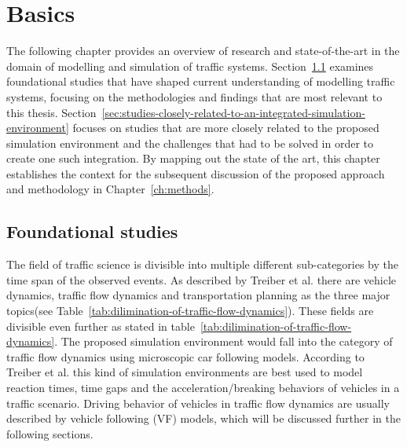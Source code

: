 \chapter{Basics}\label{ch:basics}
    The following chapter provides an overview of research and state-of-the-art in the domain of modelling and simulation of traffic systems.
    Section~\ref{sec:foundational-studies} examines foundational studies that have shaped current understanding of modelling traffic systems, focusing on the methodologies and findings that are most relevant to this thesis.
    Section~\ref{sec:studies-closely-related-to-an-integrated-simulation-environment} focuses on studies that are more closely related to the proposed simulation environment and the challenges that had to be solved in order to create one such integration.
    By mapping out the state of the art, this chapter establishes the context for the subsequent discussion of the proposed approach and methodology in Chapter~\ref{ch:methods}.


    \section{Foundational studies}\label{sec:foundational-studies}
        The field of traffic science is divisible into multiple different sub-categories by the time span of the observed events.
        As described by Treiber et al. \cite{treiber2013traffic} there are vehicle dynamics, traffic flow dynamics and transportation planning as the three major topics(see Table~\ref{tab:dilimination-of-traffic-flow-dynamics}).
        These fields are divisible even further as stated in table~\ref{tab:dilimination-of-traffic-flow-dynamics}.
        The proposed simulation environment would fall into the category of traffic flow dynamics using microscopic car following models.
        According to Treiber et al. this kind of simulation environments are best used to model reaction times, time gaps and the acceleration/breaking behaviors of vehicles in a traffic scenario.
        Driving behavior of vehicles in traffic flow dynamics are usually described by vehicle following (VF) models, which will be discussed further in the following sections.

